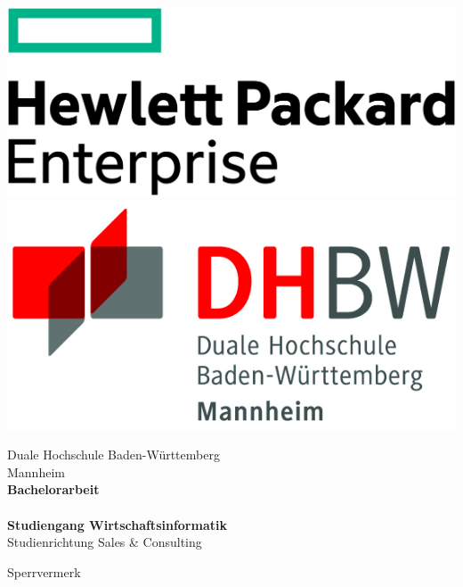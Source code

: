\begin{titlepage}
\begin{minipage}{\textwidth}
		\vspace{-2cm}
		\noindent \includegraphics[scale=0.3]{img/firmenlogo.jpg} \hfill   \includegraphics{img/logo.jpg}
\end{minipage}
\vspace{1em}
\sffamily
\begin{center}
	\textsf{\large{}Duale Hochschule Baden-W\"urttemberg\\[1.5mm] Mannheim}\\[2em]
	\textsf{\textbf{\Large{}Bachelorarbeit}}\\[3mm]
	\textsf{\textbf{\DerTitelDerArbeit}} \\[1.5cm]
	\textsf{\textbf{\Large{}Studiengang Wirtschaftsinformatik}\\[3mm] \textsf{Studienrichtung Sales \& Consulting}}
	
	\vspace{3em}
	\textsf{\Large{Sperrvermerk}}
\vfill

\begin{minipage}{\textwidth}


\end{minipage}
\end{center}
\end{titlepage}
